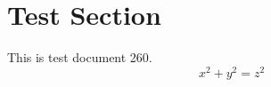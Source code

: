 \documentclass{article}
\begin{document}
\section{Test Section}
This is test document 260.
\begin{equation}
x^2 + y^2 = z^2
\end{equation}
\end{document}
